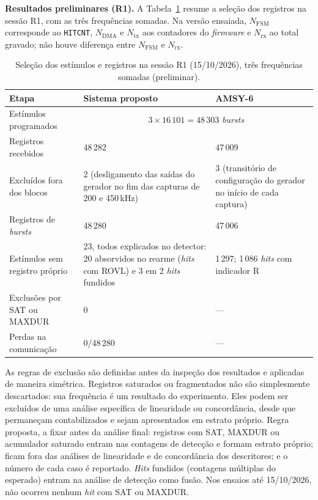 \textbf{Resultados preliminares (R1).} A Tabela~\ref{v2:tab:fluxo_r1} resume a seleção dos registros na sessão R1, com as três frequências somadas. Na versão ensaiada, \(N_{\mathrm{FSM}}\) corresponde ao \texttt{HITCNT}, \(N_{\mathrm{DMA}}\) e \(N_{\mathrm{tx}}\) aos contadores do \textit{firmware} e \(N_{\mathrm{rx}}\) ao total gravado; não houve diferença entre \(N_{\mathrm{FSM}}\) e \(N_{\mathrm{rx}}\).

\begin{table}[htbp]
	\centering
	\footnotesize
		\caption{Seleção dos estímulos e registros na sessão R1 (15/10/2026), três frequências somadas (preliminar).}
	\label{v2:tab:fluxo_r1}
	\begin{tabular}{|p{}|p{}|p{}|}
		\hline
		\textbf{Etapa} & \textbf{Sistema proposto} & \textbf{AMSY-6} \\
		\hline
		Estímulos programados & \multicolumn{2}{c|}{\(3 \times 16\,101 = 48\,303\) \textit{bursts}} \\
		\hline
		Registros recebidos & 48\,282 & 47\,009 \\
		\hline
		Excluídos fora dos blocos & 2 (desligamento das saídas do gerador no fim das capturas de 200 e 450\,kHz) & 3 (transitório de configuração do gerador no início de cada captura) \\
		\hline
		Registros de \textit{bursts} & 48\,280 & 47\,006 \\
		\hline
		Estímulos sem registro próprio & 23, todos explicados no detector: 20 absorvidos no rearme (\textit{hits} com ROVL) e 3 em 2 \textit{hits} fundidos & 1\,297; 1\,086 \textit{hits} com indicador R \\
		\hline
		Exclusões por SAT ou MAXDUR & 0 & --- \\
		\hline
		Perdas na comunicação & 0/48\,280 & --- \\
		\hline
	\end{tabular}
\end{table}


As regras de exclusão são definidas antes da inspeção dos resultados e aplicadas de maneira simétrica. Registros saturados ou fragmentados não são simplesmente descartados: sua frequência é um resultado do experimento. Eles podem ser excluídos de uma análise específica de linearidade ou concordância, desde que permaneçam contabilizados e sejam apresentados em estrato próprio. Regra proposta, a fixar antes da análise final: registros com SAT, MAXDUR ou acumulador saturado entram nas contagens de detecção e formam estrato próprio; ficam fora das análises de linearidade e de concordância dos descritores; e o número de cada caso é reportado. \textit{Hits} fundidos (contagens múltiplas do esperado) entram na análise de detecção como fusão. Nos ensaios até 15/10/2026, não ocorreu nenhum \textit{hit} com SAT ou MAXDUR.

